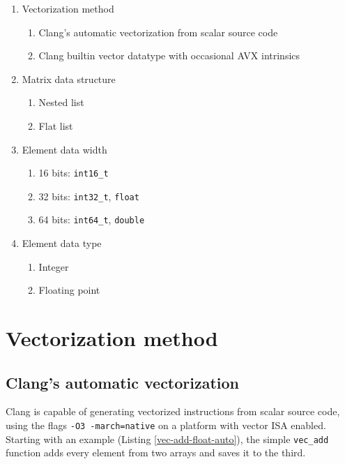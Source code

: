 \documentclass[logo,bsc,singlespacing,parskip]{infthesis}
\newenvironment{compactlist}
{ \begin{enumerate}
    \setlength{\itemsep}{0pt}
    \setlength{\parskip}{0pt}
    \setlength{\parsep}{0pt}     
}
{ \end{enumerate} }
\begin{document}
\begin{enumerate} 
    \item Vectorization method 
        \begin{compactlist} 
            \item Clang's automatic vectorization from scalar source code
            \item Clang builtin vector datatype with occasional AVX intrinsics 
        \end{compactlist}
    \item Matrix data structure 
        \begin{compactlist} 
            \item Nested list
            \item Flat list
        \end{compactlist}
    \item Element data width
        \begin{compactlist} 
            \item 16 bits: \texttt{int16\_t}
            \item 32 bits: \texttt{int32\_t}, \texttt{float}
            \item 64 bits: \texttt{int64\_t}, \texttt{double}
        \end{compactlist}
    \item Element data type 
        \begin{compactlist} 
            \item Integer
            \item Floating point
        \end{compactlist}
\end{enumerate}

\section{Vectorization method}

\subsection{Clang's automatic vectorization}
Clang is capable of generating vectorized instructions from scalar source code,
using the flags \texttt{-O3 -march=native} on a platform with vector ISA
enabled. Starting with an example (Listing \ref{vec-add-float-auto}), the simple
\texttt{vec\_add} function adds every element from two arrays and saves it to
the third. 
\end{document}
